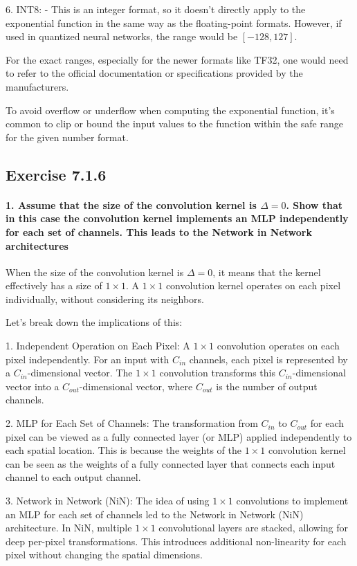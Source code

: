 6. INT8:
- This is an integer format, so it doesn't directly apply to the exponential function in the same way as the floating-point formats. However, if used in quantized neural networks, the range would be \([-128, 127]\).

For the exact ranges, especially for the newer formats like TF32, one would need to refer to the official documentation or specifications provided by the manufacturers.

To avoid overflow or underflow when computing the exponential function, it's common to clip or bound the input values to the function within the safe range for the given number format.

\subsection{Exercise 7.1.6}

\paragraph{1. Assume that the size of the convolution kernel is \(\Delta = 0 \). Show that in this case the convolution kernel implements an MLP independently for each set of channels. This leads to the Network in Network architectures}

When the size of the convolution kernel is \( \Delta = 0 \), it means that the kernel effectively has a size of \( 1 \times 1 \).
A \( 1 \times 1 \) convolution kernel operates on each pixel individually, without considering its neighbors.

Let's break down the implications of this:

1. Independent Operation on Each Pixel: A \( 1 \times 1 \) convolution operates on each pixel independently. For an input with \( C_{in} \) channels, each pixel is represented by a \( C_{in} \)-dimensional vector. The \( 1 \times 1 \) convolution transforms this \( C_{in} \)-dimensional vector into a \( C_{out} \)-dimensional vector, where \( C_{out} \) is the number of output channels.

2. MLP for Each Set of Channels: The transformation from \( C_{in} \) to \( C_{out} \) for each pixel can be viewed as a fully connected layer (or MLP) applied independently to each spatial location. This is because the weights of the \( 1 \times 1 \) convolution kernel can be seen as the weights of a fully connected layer that connects each input channel to each output channel.

3. Network in Network (NiN): The idea of using \( 1 \times 1 \) convolutions to implement an MLP for each set of channels led to the Network in Network (NiN) architecture. In NiN, multiple \( 1 \times 1 \) convolutional layers are stacked, allowing for deep per-pixel transformations. This introduces additional non-linearity for each pixel without changing the spatial dimensions.

